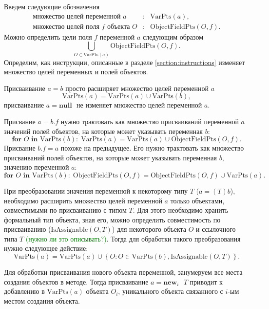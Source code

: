 \documentclass[14pt,titlepage]{extarticle}
\newcommand{\NEWi}[1]{\textbf{new}_{#1}\textbf{ }}
\newcommand{\NULL}{\textbf{null }}
\newcommand{\VPts}[1]{\textrm{VarPts}(#1)}
\newcommand{\OFPts}[2]{\textrm{ObjectFieldPts}(#1, #2)}
\newcommand{\IsAssignable}[2]{\textrm{IsAssignable}(#1, #2)}
\newcommand{\remark}[1]{\textcolor{Green}{#1}}
\begin{document}
      Введем следующие обозначения
      \begin{eqnarray*}
        \textrm{множество целей переменной $a$}&:& \VPts{a}, \\
        \textrm{множество целей поля $f$ объекта $O$}&:& \OFPts{O}{f}.
      \end{eqnarray*}
      Можно определить цели поля $f$ переменной $a$ следующим образом
      \[ \bigcup\limits_{O \in \VPts{a}} \OFPts{O}{f}.\]
      Определим, как инструкции, описанные в разделе \ref{section:instructions}
      изменяет множество целей переменных и полей объектов.

      Присваивание $a = b$ просто расширяет множество целей переменной $a$
      \[\VPts{a} = \VPts{a} \cup \VPts{b},\]
      присваивание $a = \NULL$ не изменяет множество целей переменной $a$.

      Присвание $a = b.f$ нужно трактовать как множество присваиваний
      переменной $a$ значений полей объектов, на которые может указывать переменная
      $b$:
      \[
        \textbf{for } O \textbf{ in } \VPts{b} \colon
        \; \VPts{a} = \VPts{a} \cup \OFPts{O}{f}.
      \]
      Присвание $b.f = a$ похоже на предыдущее. Его нужно трактовать как
      множество присваиваний полей объектов, на которые может указывать
      переменная $b$, значению переменной $a$:
      \[
        \textbf{for } O \textbf{ in } \VPts{b} \colon
        \; \OFPts{O}{f} = \OFPts{O}{f} \cup \VPts{a}.
      \]

      При преобразовании значения переменной к некоторому типу $T$
      ($a = (T)b$), необходимо расширить множество целей переменной $a$ только
      объектами, совместимыми по присваиванию с типом $T$. Для этого необходимо
      хранить формальный тип объекта, зная его, можно определить совместимость
      по присваиванию ($\IsAssignable{O}{T}$) для некоторого объекта $O$ и
      ссылочного типа $T$\remark{ (нужно ли это описывать?)}.
      Тогда для обработки такого преобразования нужно следующее действие:
      \[
        \VPts{a} = \VPts{a} \cup
            \left\{ O \colon O \in \VPts{b}, \IsAssignable{O}{T} \right\}.
      \]

      Для обработки присваивания нового объекта переменной, занумеруем
      все места создания объектов в методе. Тогда присваивание $a = \NEWi{i} T$
      приводит к добавлению в $\VPts{a}$ объекта $O_i$, уникального
      объекта связанного с $i$-ым местом создания объекта.
\end{document}
